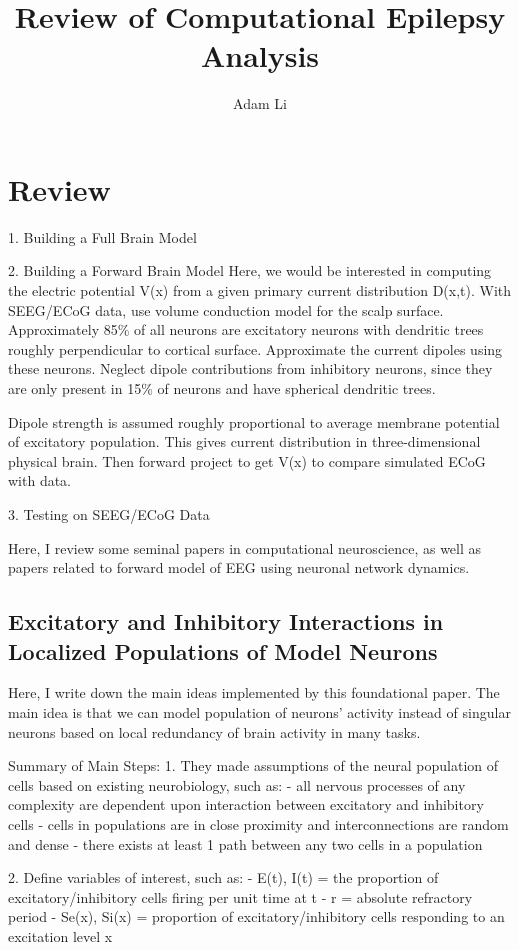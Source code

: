 \documentclass{article}
\title{Review of Computational Epilepsy Analysis}
\author{Adam Li}
\begin{document}
\section{Review}

1. Building a Full Brain Model

2. Building a Forward Brain Model
Here, we would be interested in computing the electric potential V(x) from a given primary current distribution D(x,t). With SEEG/ECoG data, use volume conduction model for the scalp surface. Approximately 85\% of all neurons are excitatory neurons with dendritic trees roughly perpendicular to cortical surface. Approximate the current dipoles using these neurons. Neglect dipole contributions from inhibitory neurons, since they are only present in 15\% of neurons and have spherical dendritic trees.

Dipole strength is assumed roughly proportional to average membrane potential of excitatory population. This gives current distribution in three-dimensional physical brain. Then forward project to get V(x) to compare simulated ECoG with data.

3. Testing on SEEG/ECoG Data

Here, I review some seminal papers in computational neuroscience, as well as papers related to forward model of EEG using neuronal network dynamics. 

\subsection{Excitatory and Inhibitory Interactions in Localized Populations of Model Neurons}
\cite{Wilson1972}

Here, I write down the main ideas implemented by this foundational paper. The main idea is that we can model population of neurons' activity instead of singular neurons based on local redundancy of brain activity in many tasks.

Summary of Main Steps:
1. They made assumptions of the neural population of cells based on existing neurobiology, such as:
- all nervous processes of any complexity are dependent upon interaction between excitatory and inhibitory cells
- cells in populations are in close proximity and interconnections are random and dense
- there exists at least 1 path between any two cells in a population

2. Define variables of interest, such as:
- E(t), I(t)  = the proportion of excitatory/inhibitory cells firing per unit time at t
- r = absolute refractory period
- Se(x), Si(x) = proportion of excitatory/inhibitory cells responding to an excitation level x
\end{document}
